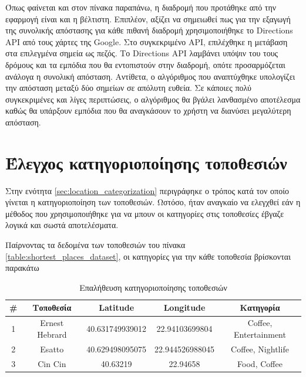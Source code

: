 \documentclass[oneside, 12pt]{book}
\begin{document}
Όπως φαίνεται και στον πίνακα παραπάνω, η διαδρομή που προτάθηκε 
από την εφαρμογή είναι και η βέλτιστη. Επιπλέον, αξίζει να 
σημειωθεί πως για την εξαγωγή της συνολικής απόστασης για κάθε 
πιθανή διαδρομή χρησιμοποιήθηκε το Directions API από τους χάρτες 
της Google. Στο συγκεκριμένο API, επιλέχθηκε η μετάβαση στα 
επιλεγμένα σημεία ως πεζός. Το Directions API λαμβάνει υπόψιν του 
τους δρόμους και τα εμπόδια που θα εντοπιστούν στην διαδρομή, οπότε 
προσαρμόζεται ανάλογα η συνολική απόσταση. Αντίθετα, ο αλγόριθμος 
που αναπτύχθηκε υπολογίζει την απόσταση μεταξύ δύο σημείων σε 
απόλυτη ευθεία. Σε κάποιες πολύ συγκεκριμένες και λίγες 
περιπτώσεις, ο αλγόριθμος θα βγάλει λανθασμένο αποτέλεσμα καθώς θα 
υπάρξουν εμπόδια που θα αναγκάσουν το χρήστη να διανύσει μεγαλύτερη 
απόσταση.

\section{Έλεγχος κατηγοριοποίησης τοποθεσιών}
Στην ενότητα \ref{sec:location_categorization} περιγράφηκε ο τρόπος 
κατά τον οποίο γίνεται η κατηγοριοποίηση των τοποθεσιών. Ωστόσο, 
ήταν αναγκαίο να ελεγχθεί εάν η μέθοδος που χρησιμοποιήθηκε για να 
μπουν οι κατηγορίες στις τοποθεσίες έβγαζε λογικά και σωστά 
αποτελέσματα.

Παίρνοντας τα δεδομένα των τοποθεσιών του πίνακα \ref{table:shortest_places_dataset}, οι κατηγορίες για την κάθε τοποθεσία βρίσκονται παρακάτω

\begin{table}[H]
\centering
    \begin{tabular}{|c|c|c|c|c|}
        \hline
        \textbf{\#} & \textbf{Τοποθεσία} & \textbf{Latitude} & \textbf{Longitude} & \textbf{Κατηγορία} \\
        \hline
        1 & Ernest Hebrard & 40.631749939012 & 22.94103699804 & Coffee, Entertainment\\
        \hline
        2 & Esatto & 40.629498095075 & 22.944526988045 & Coffee, Nightlife \\
        \hline
        3 & Cin Cin & 40.63219 & 22.94658 & Food, Coffee \\
        \hline
    \end{tabular}
    \caption{Επαλήθευση κατηγοριοποίησης τοποθεσιών\label{table:place_categorization_results}}
\end{table}
\end{document}
